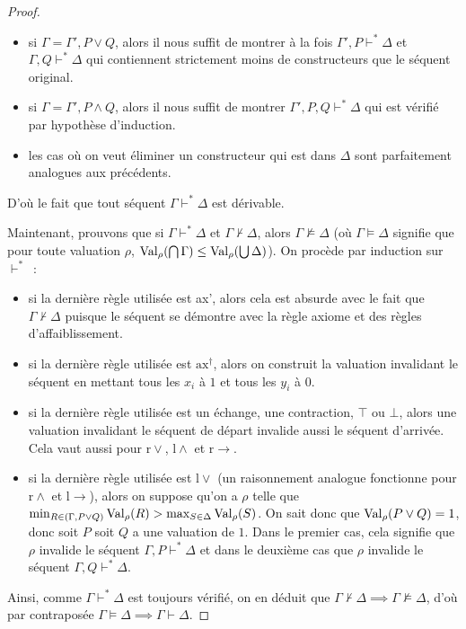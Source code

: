 \begin{proof}
\begin{itemize}
  \item si $\Gamma = \Gamma', P\lor Q$, alors il nous suffit de montrer
    à la fois $\Gamma', P\vdash^* \Delta$ et $\Gamma,Q\vdash^*\Delta$ qui
    contiennent strictement moins de constructeurs que le séquent original.
  \item si $\Gamma = \Gamma', P\land Q$, alors il nous suffit de
    montrer $\Gamma', P,Q \vdash^* \Delta$ qui est vérifié par hypothèse
    d'induction.
  \item les cas où on veut éliminer un constructeur qui est dans $\Delta$
    sont parfaitement analogues aux précédents.
  \end{itemize}
  D'où le fait que tout séquent $\Gamma\vdash^* \Delta$ est dérivable.

  Maintenant, prouvons que si $\Gamma\vdash^*\Delta$ et $\Gamma\nvdash\Delta$,
  alors $\Gamma\nvDash\Delta$ (où $\Gamma\vDash \Delta$ signifie que pour toute
  valuation
  $\rho$, $\operatorname{Val}_\rho(\bigcap \Gamma) \leq \operatorname{Val}_\rho(\bigcup \Delta)$).
  On procède par induction sur $\vdash^*$~:
  \begin{itemize}
  \item si la dernière règle utilisée est ax', alors cela est absurde avec le
    fait que $\Gamma\nvdash \Delta$ puisque le séquent se démontre avec la règle
    axiome et des règles d'affaiblissement.
  \item si la dernière règle utilisée est $\mathrm{ax}^\dagger$, alors on
    construit la valuation invalidant le séquent en mettant tous les $x_i$ à
    $1$ et tous les $y_i$ à $0$.
  \item si la dernière règle utilisée est un échange, une contraction, $\top$
    ou $\bot$, alors une valuation invalidant le séquent de départ invalide
    aussi le séquent d'arrivée. Cela vaut aussi pour $\mathrm{r}\lor$,
    $\mathrm{l}\land$ et $\mathrm{r}\to$.
  \item si la dernière règle utilisée est $\mathrm{l}\lor$ (un raisonnement
    analogue fonctionne pour $\mathrm{r}\land$ et $\mathrm{l}\to$), alors
    on suppose qu'on a $\rho$ telle que
    $\min_{R\in (\Gamma,P\lor Q)}\operatorname{Val}_\rho(R)>\max_{S\in \Delta}\operatorname{Val}_\rho(S)$. On sait
    donc que $\operatorname{Val}_\rho(P\lor Q) = 1$, donc soit $P$ soit $Q$ a une valuation
    de $1$. Dans le premier cas, cela signifie que $\rho$ invalide le
    séquent $\Gamma,P\vdash^* \Delta$ et dans le deuxième cas que $\rho$
    invalide le séquent $\Gamma,Q\vdash^* \Delta$.
  \end{itemize}

  Ainsi, comme $\Gamma\vdash^*\Delta$ est toujours vérifié, on en déduit que
  $\Gamma\nvdash\Delta\implies\Gamma\nvDash\Delta$, d'où par contraposée
  $\Gamma\vDash\Delta\implies\Gamma\vdash\Delta$.
\end{proof}

